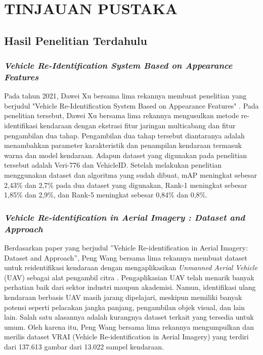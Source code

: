 \chapter{TINJAUAN PUSTAKA}

\section{Hasil Penelitian Terdahulu}

\subsection{\emph{Vehicle Re-Identification System Based on Appearance Features}}
Pada tahun 2021, Dawei Xu bersama lima rekannya membuat penelitian yang berjudul "Vehicle Re-Identification System Based on Appearance Features" \cite{Xu2022}. Pada penelitian tersebut, Dawei Xu bersama lima rekannya mengusulkan metode re-identifikasi kendaraan dengan ekstrasi fitur jaringan multicabang dan fitur pengambilan dua tahap. Pengambilan dua tahap tersebut diantaranya adalah menambahkan parameter karakteristik dan penampilan kendaraan termasuk warna dan model kendaraan. Adapun dataset yang digunakan pada penelitian tersebut adalah Veri-776 dan VehicleID. Setelah melakukan penelitian menggunakan dataset dan algoritma yang sudah dibuat, mAP meningkat sebesar 2,43\% dan 2,7\% pada dua dataset yang digunakan, Rank-1 meningkat sebesar 1,85\% dan 2,9\%, dan Rank-5 meningkat sebesar 0,84\% dan 0,8\%.

\subsection{\emph{Vehicle Re-identification in Aerial Imagery : Dataset and Approach}}
Berdasarkan paper yang berjudul ”Vehicle Re-identification in Aerial Imagery: Dataset and Approach”, Peng Wang bersama lima rekannya membuat dataset untuk reidentifikasi kendaraan dengan mengaplikasikan \emph{Unmanned Aerial Vehicle} (UAV) sebagai alat pengambil citra \cite{Wang2019vehicle}. Pengaplikasian UAV telah menarik banyak perhatian baik dari sektor industri maupun akademisi. Namun, identifikasi ulang kendaraan berbasis UAV masih jarang dipelajari, meskipun memiliki banyak potensi seperti pelacakan jangka panjang, pengambilan objek visual, dan lain lain. Salah satu alasannya adalah kurangnya dataset terkait yang tersedia untuk umum. Oleh karena itu, Peng Wang bersama lima rekannya mengumpulkan dan merilis dataset VRAI (Vehicle Re-identification in Aerial Imagery) yang terdiri dari 137.613 gambar dari 13.022 sampel kendaraan.

